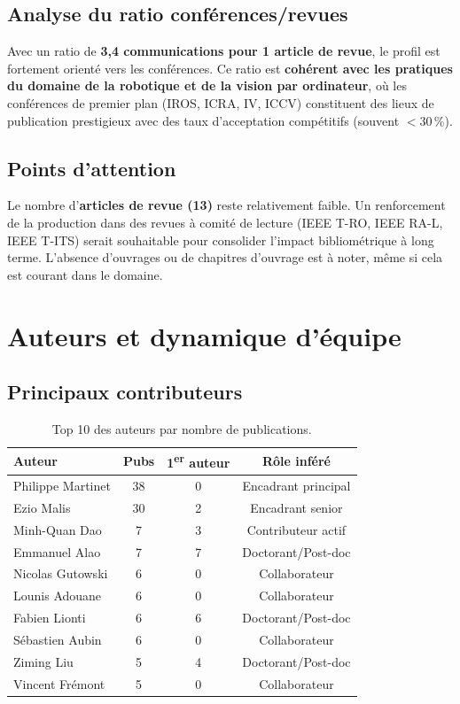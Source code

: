 \documentclass[a4paper,11pt]{article}
\begin{document}
\subsection{Analyse du ratio conférences/revues}

Avec un ratio de \textbf{3,4 communications pour 1 article de revue}, le profil est fortement orienté vers les conférences. Ce ratio est \textbf{cohérent avec les pratiques du domaine de la robotique et de la vision par ordinateur}, où les conférences de premier plan (IROS, ICRA, IV, ICCV) constituent des lieux de publication prestigieux avec des taux d'acceptation compétitifs (souvent $< 30\,\%$).

\subsection{Points d'attention}

Le nombre d'\textbf{articles de revue (13)} reste relativement faible. Un renforcement de la production dans des revues à comité de lecture (IEEE T-RO, IEEE RA-L, IEEE T-ITS) serait souhaitable pour consolider l'impact bibliométrique à long terme. L'absence d'ouvrages ou de chapitres d'ouvrage est à noter, même si cela est courant dans le domaine.

\section{Auteurs et dynamique d'équipe}

\subsection{Principaux contributeurs}

\begin{table}[h!]
\centering
\begin{tabular}{lccc}
\toprule
\textbf{Auteur} & \textbf{Pubs} & \textbf{1\textsuperscript{er} auteur} & \textbf{Rôle inféré} \\
\midrule
Philippe Martinet  & 38 & 0 & Encadrant principal \\
Ezio Malis         & 30 & 2 & Encadrant senior \\
Minh-Quan Dao      & 7  & 3 & Contributeur actif \\
Emmanuel Alao      & 7  & 7 & Doctorant/Post-doc \\
Nicolas Gutowski   & 6  & 0 & Collaborateur \\
Lounis Adouane     & 6  & 0 & Collaborateur \\
Fabien Lionti      & 6  & 6 & Doctorant/Post-doc \\
Sébastien Aubin    & 6  & 0 & Collaborateur \\
Ziming Liu         & 5  & 4 & Doctorant/Post-doc \\
Vincent Frémont    & 5  & 0 & Collaborateur \\
\bottomrule
\end{tabular}
\caption{Top 10 des auteurs par nombre de publications.}
\end{table}
\end{document}
